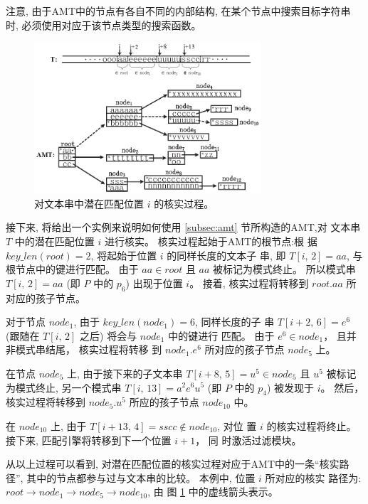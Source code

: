 注意, 由于AMT中的节点有各自不同的内部结构, 在某个节点中搜索目标字符串
时, 必须使用对应于该节点类型的搜索函数。

\begin{figure}[H]
  \centering
  \includegraphics[width=0.75\textwidth]{figures/2_MPM/match}
  \caption{对文本串中潜在匹配位置 $i$ 的核实过程。}
  \label{fig:matching}
\end{figure}

接下来, 将给出一个实例来说明如何使用 \ref{subsec:amt} 节所构造的AMT,对
文本串 $T$ 中的潜在匹配位置 $i$ 进行核实。 核实过程起始于AMT的根节点:根
据 $key\_len(root)=2$, 将起始于位置 $i$ 的同样长度的文本子
串, 即 $T[i,\,2]=aa$, 与根节点中的键进行匹配。 由于 $aa \in
root$ 且 $aa$ 被标记为模式终止。 所以模式串 $T[i,\,2]=aa$
(即 $P$ 中的 $p_6$) 出现于位置 $i$。 接着, 核实过程将转移到 $root.aa$ 所
对应的孩子节点。

对于节点 $node_1$, 由于 $key\_len(node_1)=6$, 同样长度的子
串 $T[i+2,\,6]=e^6$ (跟随在 $T[i,\,2]$ 之后) 将会与 $node_1$ 中的键进行
匹配。 由于 $e^6 \in node_1$， 且并非模式串结尾， 核实过程将转移
到 $node_1.e^6$ 所对应的孩子节点 $node_5$ 上。

在节点 $node_5$ 上, 由于接下来的子文本串 $T[i+8,\,5]=u^5 \in
node_5$ 且 $u^5$ 被标记为模式终止, 另一个模式串 $T[i,\,13]=a^2e^6u^5$
(即 $P$ 中的 $p_4$) 被发现于 $i$。 然后，核实过程将转移到 $node_5.u^5$
所应的孩子节点 $node_{10}$ 中。

在 $node_{10}$ 上, 由于 $T[i+13,\,4]=sscc \notin node_{10}$, 对位
置 $i$ 的核实过程将终止。 接下来, 匹配引擎将转移到下一个位置 $i+1$， 同
时激活过滤模块。

从以上过程可以看到, 对潜在匹配位置的核实过程对应于AMT中的一条“核实路
径”, 其中的节点都参与过与文本串的比较。 本例中, 位置 $i$ 所对应的核实
路径为:
$root \rightarrow node_1 \rightarrow node_5 \rightarrow node_{10}$, 由
图 \ref{fig:matching} 中的虚线箭头表示。


